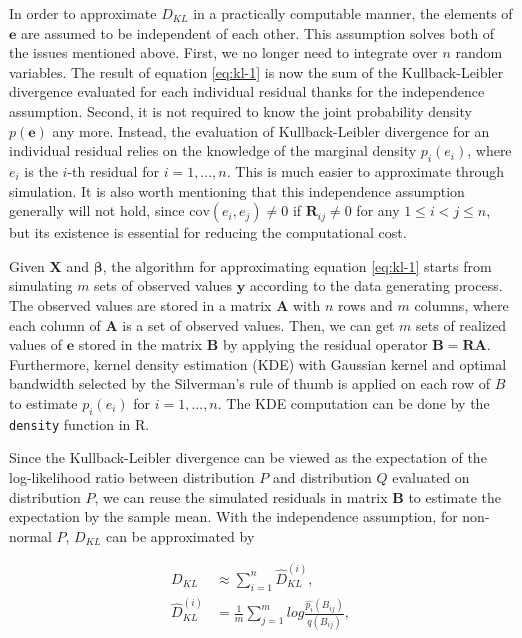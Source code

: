 \documentclass[]{interact}
\theoremstyle{plain}%
\theoremstyle{definition}
\theoremstyle{remark}
\begin{document}
In order to approximate \(D_{KL}\) in a practically computable manner,
the elements of \(\boldsymbol{e}\) are assumed to be independent of each
other. This assumption solves both of the issues mentioned above. First,
we no longer need to integrate over \(n\) random variables. The result
of equation \ref{eq:kl-1} is now the sum of the Kullback-Leibler
divergence evaluated for each individual residual thanks for the
independence assumption. Second, it is not required to know the joint
probability density \(p(\boldsymbol{e})\) any more. Instead, the
evaluation of Kullback-Leibler divergence for an individual residual
relies on the knowledge of the marginal density \(p_i(e_i)\), where
\(e_i\) is the \(i\)-th residual for \(i = 1, ..., n\). This is much
easier to approximate through simulation. It is also worth mentioning
that this independence assumption generally will not hold, since
\(\text{cov}(e_i, e_j) \neq 0\) if \(\boldsymbol{R}_{ij} \neq 0\) for
any \(1 \leq i < j \leq n\), but its existence is essential for reducing
the computational cost.

Given \(\boldsymbol{X}\) and \(\boldsymbol{\beta}\), the algorithm for
approximating equation \ref{eq:kl-1} starts from simulating \(m\) sets
of observed values \(\boldsymbol{y}\) according to the data generating
process. The observed values are stored in a matrix \(\boldsymbol{A}\)
with \(n\) rows and \(m\) columns, where each column of
\(\boldsymbol{A}\) is a set of observed values. Then, we can get \(m\)
sets of realized values of \(\boldsymbol{e}\) stored in the matrix
\(\boldsymbol{B}\) by applying the residual operator
\(\boldsymbol{B} = \boldsymbol{R}\boldsymbol{A}\). Furthermore, kernel
density estimation (KDE) with Gaussian kernel and optimal bandwidth
selected by the Silverman's rule of thumb \citep{silverman2018density}
is applied on each row of \(B\) to estimate \(p_i(e_i)\) for
\(i = 1, ..., n\). The KDE computation can be done by the
\texttt{density} function in R.

Since the Kullback-Leibler divergence can be viewed as the expectation
of the log-likelihood ratio between distribution \(P\) and distribution
\(Q\) evaluated on distribution \(P\), we can reuse the simulated
residuals in matrix \(\boldsymbol{B}\) to estimate the expectation by
the sample mean. With the independence assumption, for non-normal \(P\),
\(D_{KL}\) can be approximated by

\begin{align}
\label{eq:kl-3}
D_{KL} &\approx \sum_{i = 1}^{n} \hat{D}_{KL}^{(i)}, \\
\hat{D}_{KL}^{(i)} &= \frac{1}{m}\sum_{j = 1}^{m} log\frac{\hat{p_i}(B_{ij})}{q(B_{ij})},
\end{align}
\end{document}
